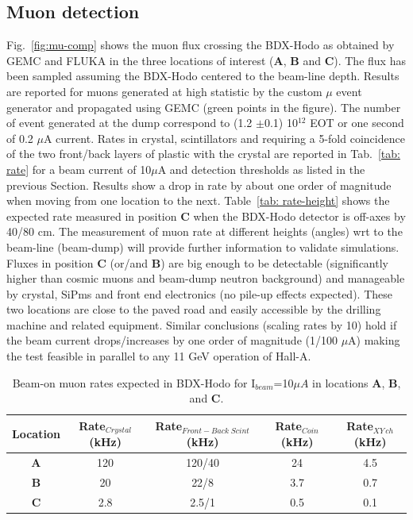 \subsection{Muon detection}
Fig.~\ref{fig:mu-comp} shows the muon flux crossing the BDX-Hodo  as obtained by GEMC and FLUKA  in the  three locations of interest ({\bf A}, {\bf B} and {\bf C}).
The flux has been sampled assuming the BDX-Hodo centered to  the beam-line depth.
Results are reported for muons generated at high statistic by the custom $\mu$ event generator and propagated using GEMC (green points in the figure).
The number of event generated at the dump correspond to  (1.2 $\pm$0.1) 10$^{12}$ EOT or one second of 0.2 $\mu$A current.
Rates in crystal, scintillators and  requiring a 5-fold coincidence of the two front/back layers of plastic with  the crystal are reported in Tab.~\ref{tab: rate} for a beam current of 10$\mu$A and detection thresholds as listed in the previous Section. Results show a drop in rate by about one order of magnitude when moving from one location to the next. 
Table~\ref{tab: rate-height}  shows the expected rate measured in  position {\bf C}  when the BDX-Hodo detector is off-axes by 40/80 cm. The measurement of muon rate at different heights (angles) wrt to the beam-line (beam-dump) will provide further information to validate simulations.  
Fluxes in position {\bf C} (or/and {\bf B}) are big enough to be detectable (significantly higher than cosmic muons and beam-dump neutron background) and manageable  by crystal, SiPms and front end electronics (no pile-up effects expected). These two locations are close to the paved road and easily accessible by the drilling machine and related equipment. Similar conclusions (scaling rates by 10) hold  if the beam current drops/increases by one order of magnitude (1/100 $\mu$A) making the test feasible in parallel to any 11 GeV operation of Hall-A.

\begin{table}[htp]
\caption{Beam-on muon rates expected in BDX-Hodo for I$_{beam}$=10$\mu A$ in locations {\bf A}, {\bf B},  and {\bf C}.}
\begin{center}
\begin{tabular}{|c|c|c|c|c|}
\hline
Location & Rate$_{Crystal}$  (kHz)&  Rate$_{Front-Back \;Scint} $(kHz) & Rate$_{Coin}$ (kHz) & Rate$_{XY\, ch} $(kHz)\\
\hline\hline
{\bf A}  & 120  &120/40    & 24 &4.5 \\
 \hline
{\bf B} & 20 &  22/8 & 3.7 & 0.7\\
 \hline
{\bf C} & 2.8 &  2.5/1 & 0.5 & 0.1 \\
\hline\hline
\end{tabular}
\end{center}
\label{tab:rate}
\end{table}%

